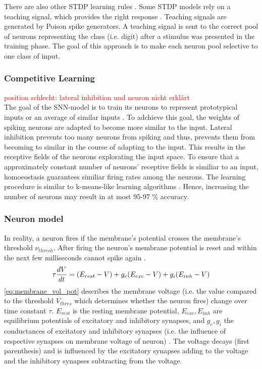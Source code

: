 There are also other \ac{STDP} learning rules \cite{SNN}.
Some \ac{STDP} models rely on a teaching signal, which provides the right response \cite{STDP_like}.
Teaching signals are generated by Poison spike generators.
A teaching signal is sent to the correct pool of neurons representing the class (i.e. digit) after a stimulus was presented in the training phase.
The goal of this approach is to make each neuron pool selective to one class of input.


\subsubsection{Competitive Learning}
\textcolor{red}{position schlecht: lateral inhibition und neuron nicht erklärt\\}
The goal of the \ac{SNN}-model is to train its neurons to represent prototypical inputs or an average of similar inputs \cite{SNN}.
To adchieve this goal, the weights of spiking neurons are adapted to become more similar to the input.
Lateral inhibition prevents too many neurons from spiking and thus, prevents them from becoming to similar in the course of adapting to the input.
This results in the receptive fields of the neurons explorating the input space.
To ensure that a approximately constant number of neurons' receptive fields is similiar to an input, 
homoeostasis guarantees similiar firing rates among the neurons.
The learning procedure is similar to k-means-like learning algorithms \cite{SNN}.
Hence, increasing the number of neurons may result in at most 95-97 \% accuracy.


\subsubsection{Neuron model}
\label{subsubsec:neuron_model}
In reality, a neuron fires if the membrane's potential crosses the membrane's threshold $\nu_{thresh}$.
After firing the neuron's membrane potential is reset and within the next few milliseconds cannot spike again \cite{SNN}.
%
\begin{equation}
    \centering
    \label{eq:membrane_vol_pot}
    \tau \frac{dV}{dt} = (E_{rest} - V) + g_e(E_{exc} - V) + g_i(E_{inh} - V)
\end{equation}
%
\autoref{eq:membrane_vol_pot} describes the membrane voltage 
(i.e. the value compared to the threshold $V_{thres}$ which determines whether the neuron fires) change over time constant $\tau$.
$E_{rest}$ is the resting membrane potential, $E_{exc}, E_{inh}$ are equilibrium potentials of excitatory and inhibitory synapses, 
and $g_e, g_i$ the conductances of excitatory and inhibitory synapses (i.e. the influence of respective synapses on membrane voltage of neuron) \cite{SNN}. 
The voltage decays (first parenthesis) and is influenced by the excitatory synapses 
adding to the voltage and the inhibitory synapses subtracting from the voltage.


